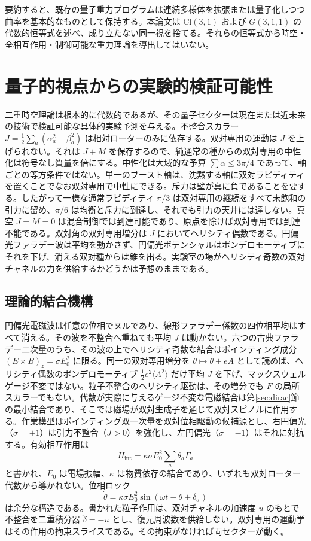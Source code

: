 \documentclass[a4paper]{article}
\begin{document}
要約すると、既存の量子重力プログラムは連続多様体を拡張または量子化しつつ曲率を基本的なものとして保持する。本論文は $\mathrm{Cl}(3,1)$ および $G(3,1,1)$ の代数的恒等式を述べ、成り立たない同一視を捨てる。それらの恒等式から時空・全相互作用・制御可能な重力理論を導出してはいない。

\section{量子的視点からの実験的検証可能性}
\label{sec:experiments}

二重時空理論は根本的に代数的であるが、その量子セクターは現在または近未来の技術で検証可能な具体的実験予測を与える。不整合スカラー $J=\tfrac12\sum_a(\alpha_a^2-\beta_a^2)$ は相対ローターのみに依存する。双対専用の運動は $J$ を上げられない。それは $J+M$ を保存するので、純通常の種からの双対専用の中性化は符号なし質量を倍にする。中性化は大域的な予算 $\sum\alpha\le 3\pi/4$ であって、軸ごとの等方条件ではない。単一のブースト軸は、沈黙する軸に双対ラピディティを置くことでなお双対専用で中性にできる。斥力は壁が真に負であることを要する。したがって一様な通常ラピディティ \(\pi/3\) は双対専用の継続をすべて未飽和の引力に留め、\(\pi/6\) は均衡と斥力に到達し、それでも引力の天井には達しない。真空 $J=M=0$ は混合制御では到達可能であり、原点を除けば双対専用では到達不能である。双対角の双対専用増分は $J$ においてヘリシティ偶数である。円偏光ファラデー波は平均を動かさず、円偏光ポテンシャルはポンデロモーティブにそれを下げ、消える双対種からは錐を出る。実験室の場がヘリシティ奇数の双対チャネルの力を供給するかどうかは予想のままである。

\subsection{理論的結合機構}

円偏光電磁波は任意の位相でヌルであり、線形ファラデー係数の四位相平均はすべて消える。その波を不整合へ重ねても平均 $J$ は動かない。六つの古典ファラデー二次量のうち、その波の上でヘリシティ奇数な結合はポインティング成分 $(E\times B)_z=\sigma E_0^2$ に限る。同一の双対専用増分を $\theta\mapsto\theta+eA$ として読めば、ヘリシティ偶数のポンデロモーティブ $\tfrac12 e^2\langle A^2\rangle$ だけ平均 $J$ を下げ、マックスウェルゲージ不変ではない。粒子不整合のヘリシティ駆動は、その増分でも $F$ の局所スカラーでもない。代数が実際に与えるゲージ不変な電磁結合は第\ref{sec:dirac}節の最小結合であり、そこでは磁場が双対生成子を通じて双対スピノルに作用する。作業模型はポインティング双一次量を双対位相駆動の候補源とし、右円偏光（$\sigma=+1$）は引力不整合（$J>0$）を強化し、左円偏光（$\sigma=-1$）はそれに対抗する。有効相互作用は
\[
H_\text{int} = \kappa \sigma E_0^2 \sum_a \theta_a \Gamma_a
\]
と書かれ、$E_0$ は電場振幅、$\kappa$ は物質依存の結合であり、いずれも双対ローター代数から導かれない。位相ロック
\[
\dot{\theta} = \kappa \sigma E_0^2 \sin(\omega t - \theta + \delta_\sigma)
\]
は余分な構造である。書かれた粒子作用は、双対チャネルの加速度 $u$ のもとで不整合を二重積分器 $\ddot\delta=-u$ とし、復元周波数を供給しない。双対専用の運動学はその作用の拘束スライスである。その拘束がなければ両セクターが動く。
\end{document}
